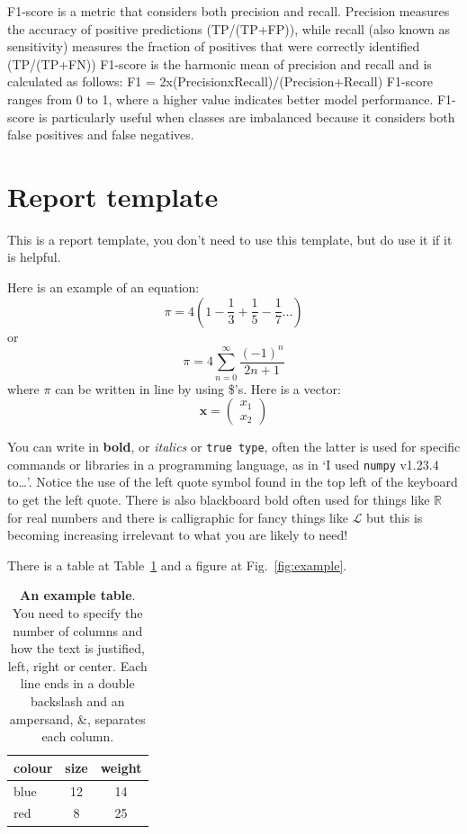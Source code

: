 \documentclass[12pt]{article}
\begin{document}
F1-score is a metric that considers both precision and recall. Precision measures the accuracy of positive predictions (TP/(TP+FP)), while recall (also known as sensitivity) measures the fraction of positives that were correctly identified (TP/(TP+FN))
F1-score is the harmonic mean of precision and recall and is calculated as follows:
F1 = 2x(PrecisionxRecall)/(Precision+Recall)
F1-score ranges from 0 to 1, where a higher value indicates better model performance. F1-score is particularly useful when classes are imbalanced because it considers both false positives and false negatives.


\section*{Report template}

This is a report template, you don't need to use this template, but do
use it if it is helpful.


Here is an example of an equation:
\begin{equation}
  \pi=4\left(1-\frac{1}{3}+\frac{1}{5}-\frac{1}{7}\ldots\right)
\end{equation}
or
\begin{equation}
  \pi=4\sum_{n=0}^\infty\frac{(-1)^{n}}{2n+1}
\end{equation}
where $\pi$ can be written in line by using \$'s. Here is a vector:
\begin{equation}
\mathbf{x}=\left(\begin{array}{c}x_1\\x_2\end{array}\right)
\end{equation}

You can write in \textbf{bold}, or \textsl{italics} or \texttt{true
  type}, often the latter is used for specific commands or libraries in a
programming language, as in `I used \texttt{numpy} v1.23.4 to\ldots'. Notice the use of the left quote symbol found in the top left of the keyboard to get the left quote. There is also blackboard bold often used for things like $\mathbb{R}$ for real numbers and there is calligraphic for fancy things like $\mathcal{L}$ but this is becoming increasing irrelevant to what you are likely to need! 

There is a table at Table~\ref{tab:example} and a figure at Fig.~\ref{fig:example}.

\begin{table}
\begin{center}
\begin{tabular}{l|cc}
colour&size&weight\\
\hline
blue&12&14\\
red&8&25
\end{tabular}
\end{center} 
\caption{\textbf{An example table}. You need to specify the number of columns and how the text is justified, left, right or center. Each line ends in a double backslash and an ampersand, \&, separates each column.}
\label{tab:example}
\end{table} 
\end{document}
